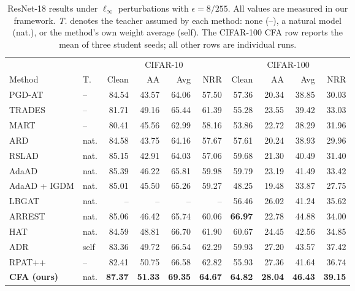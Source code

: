 \begin{table}[!htbp]
  \centering
  \footnotesize
  \setlength{\tabcolsep}{3.2pt}
  \caption{
  ResNet-18 results under \(\ell_\infty\) perturbations with
  \(\epsilon=8/255\). All values are measured in our framework.
  \emph{T.} denotes the teacher assumed by each method: none (--),
  a natural model (nat.), or the method's own weight average (self).
  The CIFAR-100 CFA row reports the mean of three student seeds;
  all other rows are individual runs.
  }
  \label{tab:main}
  \begin{tabular}{llrrrrrrrr}
    \toprule
    & & \multicolumn{4}{c}{CIFAR-10}
      & \multicolumn{4}{c}{CIFAR-100} \\
    \cmidrule(lr){3-6}\cmidrule(lr){7-10}
    Method & T. & Clean & AA & Avg & NRR
           & Clean & AA & Avg & NRR \\
    \midrule
    PGD-AT & -- & 84.54 & 43.57 & 64.06 & 57.50
                 & 57.36 & 20.34 & 38.85 & 30.03 \\
    TRADES & -- & 81.71 & 49.16 & 65.44 & 61.39
                 & 55.28 & 23.55 & 39.42 & 33.03 \\
    MART   & -- & 80.41 & 45.56 & 62.99 & 58.16
                 & 53.86 & 22.72 & 38.29 & 31.96 \\
    \midrule
    ARD & nat. & 84.58 & 43.75 & 64.16 & 57.67
               & 57.61 & 20.24 & 38.93 & 29.96 \\
    RSLAD & nat. & 85.15 & 42.91 & 64.03 & 57.06
                 & 59.68 & 21.30 & 40.49 & 31.40 \\
    AdaAD & nat. & 85.39 & 46.22 & 65.81 & 59.98
                 & 59.79 & 23.19 & 41.49 & 33.42 \\
    AdaAD + IGDM & nat. & 85.01 & 45.50 & 65.26 & 59.27
                        & 48.25 & 19.48 & 33.87 & 27.75 \\
    LBGAT & nat. & -- & -- & -- & --
                 & 56.46 & 26.02 & 41.24 & 35.62 \\
    ARREST & nat. & 85.06 & 46.42 & 65.74 & 60.06
                  & \textbf{66.97} & 22.78 & 44.88 & 34.00 \\
    \midrule
    HAT & nat. & 84.59 & 48.81 & 66.70 & 61.90
               & 60.67 & 24.45 & 42.56 & 34.85 \\
    ADR & self & 83.36 & 49.72 & 66.54 & 62.29
               & 59.93 & 27.20 & 43.57 & 37.42 \\
    RPAT++ & -- & 82.41 & 50.75 & 66.58 & 62.82
                  & 55.93 & 27.36 & 41.64 & 36.74 \\
    \midrule
    \textbf{CFA (ours)}
      & nat.
      & \textbf{87.37} & \textbf{51.33}
      & \textbf{69.35} & \textbf{64.67}
      & \textbf{64.82} & \textbf{28.04}
      & \textbf{46.43} & \textbf{39.15} \\
    \bottomrule
  \end{tabular}
\end{table}

